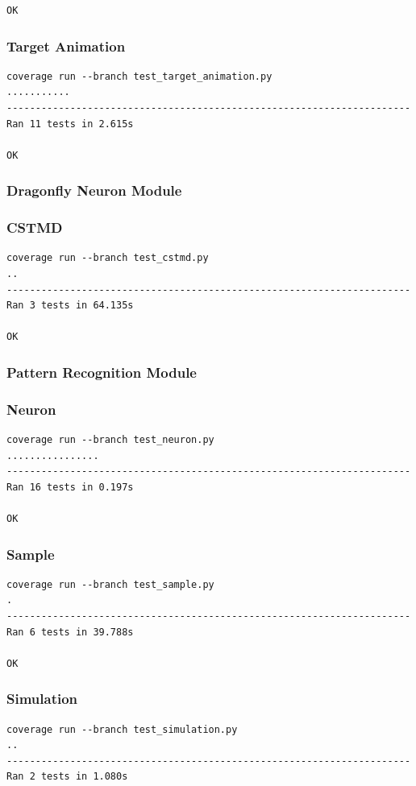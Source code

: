 \documentclass[a4paper,11pt]{article}
\begin{document}
\begin{appendices}
\begin{verbatim}
OK
\end{verbatim}
\subsubsection*{Target Animation}
\begin{verbatim}
coverage run --branch test_target_animation.py
...........
----------------------------------------------------------------------
Ran 11 tests in 2.615s

OK
\end{verbatim}

\subsubsection{Dragonfly Neuron Module}
\subsubsection*{CSTMD}
\begin{verbatim}
coverage run --branch test_cstmd.py
..
----------------------------------------------------------------------
Ran 3 tests in 64.135s

OK
\end{verbatim}

\subsubsection{Pattern Recognition Module}
\subsubsection*{Neuron}
\begin{verbatim}
coverage run --branch test_neuron.py
................
----------------------------------------------------------------------
Ran 16 tests in 0.197s

OK
\end{verbatim}

\subsubsection*{Sample}
\begin{verbatim}
coverage run --branch test_sample.py
.
----------------------------------------------------------------------
Ran 6 tests in 39.788s

OK
\end{verbatim}

\subsubsection*{Simulation}
\begin{verbatim}
coverage run --branch test_simulation.py
..
----------------------------------------------------------------------
Ran 2 tests in 1.080s


\end{verbatim}
\end{appendices}
\end{document}
